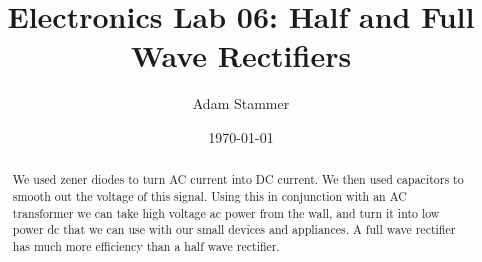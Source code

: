 \documentclass[prb,preprint]{revtex4-1}
\begin{document}
\title{Electronics Lab 06: Half and Full Wave Rectifiers}
\author{Adam Stammer}

\date{\today}

\begin{abstract}
We used zener diodes to turn AC current into DC current. We then used capacitors to smooth out the voltage of this signal. Using this in conjunction with an AC transformer we can take high voltage ac power from the wall, and turn it into low power dc that we can use with our small devices and appliances. A full wave rectifier has much more efficiency than a half wave rectifier.
\end{abstract}

\maketitle


%
%
%
%
%
%
%
%
\end{document}
